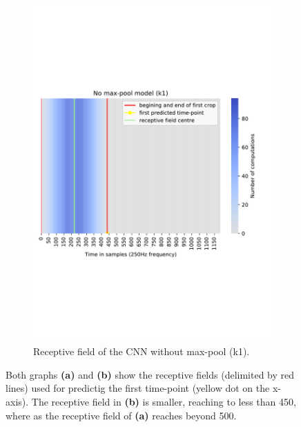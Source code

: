 \begin{figure}[!htpb]
\begin{subfigure}[b]{0.44\textwidth}
   \includegraphics[width=\linewidth]{img/ch3/k1-receptive-field}
   \caption{Receptive field of the CNN without max-pool (k1).}
\end{subfigure}
\caption[Receptive field comparison]{Both graphs \textbf{(a)} and \textbf{(b)} show the receptive fields (delimited by red lines) used for predictig the first time-point (yellow dot on the x-axis).
The receptive field in \textbf{(b)} is smaller, reaching to less than 450, where as the receptive field of \textbf{(a)} reaches beyond 500.}
\label{fig:receptive-field-comparison}
\end{figure}

